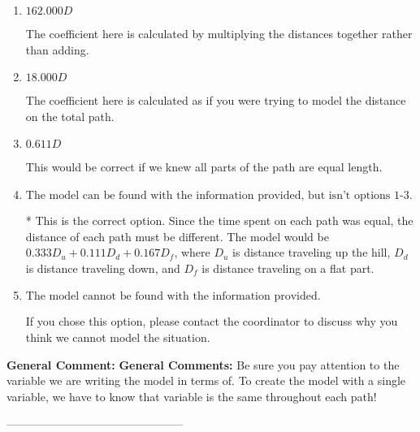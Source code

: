 \documentclass{extbook}[14pt]
\begin{document}
\begin{enumerate}[label=\Alph*.] 
\item $ 162.000 D $ 

 The coefficient here is calculated by multiplying the distances together rather than adding. 
\item $ 18.000 D $ 

 The coefficient here is calculated as if you were trying to model the distance on the total path. 
\item $ 0.611 D $ 

 This would be correct if we knew all parts of the path are equal length. 
\item $ \text{The model can be found with the information provided, but isn't options 1-3.} $ 

 * This is the correct option. Since the time spent on each path was equal, the distance of each path must be different. The model would be $0.333D_u + 0.111D_d + 0.167D_f$, where $D_u$ is distance traveling up the hill, $D_d$ is distance traveling down, and $D_f$ is distance traveling on a flat part. 
\item $ \text{The model cannot be found with the information provided.} $ 

 If you chose this option, please contact the coordinator to discuss why you think we cannot model the situation. 
\end{enumerate} 
 
\textbf{General Comment:} \textbf{General Comments:} Be sure you pay attention to the variable we are writing the model in terms of. To create the model with a single variable, we have to know that variable is the same throughout each path! 

-----------------------------------------------
\end{document}
